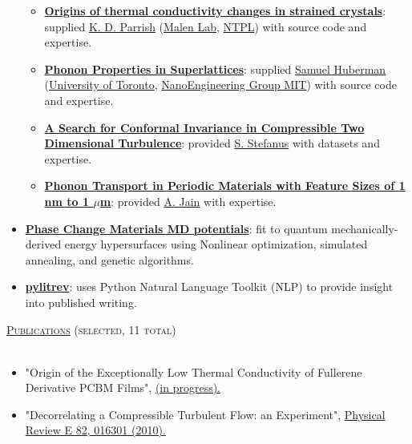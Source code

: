 \documentclass{article}
\newcommand{\lineunder}{\vspace*{-8pt} \\ \hspace*{-18pt} \hrulefill \\}
\newcommand{\header}[1]{{\hspace*{-15pt}\vspace*{6pt} \textsc{#1}} \vspace*{-6pt} \lineunder}
\newenvironment{achievements}{\begin{list}{$\bullet$}{\topsep 0pt \itemsep -2pt}}{\vspace*{4pt}\end{list}}
\begin{document}
\begin{itemize}[leftmargin=*]
\begin{itemize}
  \item \textbf{\href{http://ntpl.me.cmu.edu/publications.html}{Origins of thermal conductivity changes in strained crystals}}: supplied \href{http://www.kdparrish.com/}{K. D. Parrish} (\href{http://www.cmu.edu/me/malen/Lab_Website/People.html}{Malen Lab}, \href{http://ntpl.me.cmu.edu/people.html}{NTPL}) with source code and expertise. 

  \item \textbf{\href{https://tspace.library.utoronto.ca/bitstream/1807/42871/1/Huberman_Samuel_C_201311_MASc_thesis.pdf}{Phonon Properties in Superlattices}}: supplied \href{http://web.mit.edu/schuberm/www/}{Samuel Huberman} (\href{http://www.mie.utoronto.ca/labs/atoms/}{University of Toronto}, \href{http://web.mit.edu/nanoengineering/people/students.shtml}{NanoEngineering Group MIT}) with source code and expertise.  

  \item \textbf{\href{http://jasonlarkin.github.io/pub.html}{A Search for Conformal Invariance in Compressible Two Dimensional Turbulence}}: provided \href{http://www.physicsandastronomy.pitt.edu/news-story/phd-defense-stefanus}{S. Stefanus} with  datasets and expertise.     

  \item \textbf{\href{http://blogs.ubc.ca/amerimech2014/files/2014/04/ameritech_mcgaughey_apr14.pdf}{Phonon Transport in Periodic Materials with Feature Sizes of 1 nm to 1 $\mu$m}}: provided \href{http://ntpl.me.cmu.edu/people.html}{A. Jain} with expertise. 

\end{itemize}

\item \textbf{\href{https://github.com/jasonlarkin/pcm-potentials}{Phase Change Materials MD potentials}}: fit to quantum mechanically-derived energy hypersurfaces using Nonlinear optimization, simulated annealing, and genetic algorithms. 

\item \textbf{\href{https://github.com/jasonlarkin/pylitrev}{pylitrev}}: uses Python Natural Language Toolkit (NLP) to provide insight into published writing. 

\end{itemize}

\header{\href{http://jasonlarkin.github.io/pub.html}{Publications} (selected, 11 total)}
\begin{itemize}[leftmargin=*]
\item "Origin of the Exceptionally Low Thermal Conductivity of Fullerene Derivative  PCBM Films", 
\href{http://jasonlarkin.github.io/projects-phd-pcbm.html}{(in progress).}
\item "Decorrelating a Compressible Turbulent Flow: an Experiment", \href{http://pre.aps.org/abstract/PRE/v82/i1/e016301}{Physical Review E 82, 016301 (2010).}
\end{itemize}
\end{document}
